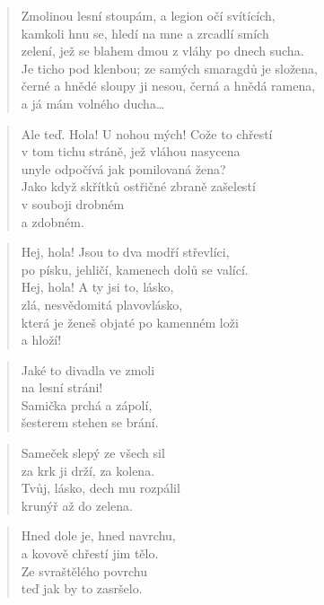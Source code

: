 \documentclass{book}
\begin{document}
\begin{verse}
Zmolinou lesní stoupám, a legion očí svítících,\\
kamkoli hnu se, hledí na mne a zrcadlí smích\\
zelení, jež se blahem dmou z vláhy po dnech sucha.\\
Je ticho pod klenbou; ze samých smaragdů je složena,\\
černé a hnědé sloupy ji nesou, černá a hnědá ramena,\\
a já mám volného ducha\ldots
\end{verse}
\begin{verse}
Ale teď. Hola! U nohou mých! Cože to chřestí\\
v tom tichu stráně, jež vláhou nasycena\\
unyle odpočívá jak pomilovaná žena?\\
Jako když skřítků ostřičné zbraně zašelestí\\
v souboji drobném\\
a zdobném.
\end{verse}
\begin{verse}
Hej, hola! Jsou to dva modří střevlíci,\\
po písku, jehličí, kamenech dolů se valící.\\
Hej, hola! A ty jsi to, lásko,\\
zlá, nesvědomitá plavovlásko,\\
která je ženeš objaté po kamenném loži\\
a hloží!
\end{verse}
\begin{verse}
Jaké to divadla ve zmoli\\
na lesní stráni!\\
Samička prchá a zápolí,\\
šesterem stehen se brání.
\end{verse}
\begin{verse}
Sameček slepý ze všech sil\\
za krk ji drží, za kolena.\\
Tvůj, lásko, dech mu rozpálil\\
krunýř až do zelena.
\end{verse}
\begin{verse}
Hned dole je, hned navrchu,\\
a kovově chřestí jim tělo.\\
Ze svraštělého povrchu\\
teď jak by to zasršelo.
\end{verse}
\end{document}
